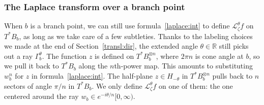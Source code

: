 \documentclass{article}
\theoremstyle{definition}
\newcommand{\maps}{\colon}
\newcommand{\R}{\mathbb{R}}
\newcommand{\C}{\mathbb{C}}
\newcommand{\laplace}{\mathcal{L}}
\newcommand{\borel}{\mathcal{B}}
\begin{document}
\subsubsection{The Laplace transform over a branch point}
When $b$ is a branch point, we can still use formula~\ref{laplace:int} to define $\laplace_\zeta^\theta f$ on $T^*B_b$, as long as we take care of a few subtleties. Thanks to the labeling choices we made at the end of Section~\ref{transl:dir}, the extended angle $\theta \in \R$ still picks out a ray $\Gamma_b^\theta$. The function $z$ is defined on $T^*B_b^{\otimes n}$, where $2\pi n$ is cone angle at $b$, so we pull it back to $T^*B_b$ along the $n$th-power map. This amounts to substituting $w_b^n$ for $z$ in formula~\ref{laplace:int}. The half-plane $z \in H_{-\theta}$ in $T^*B_b^{\otimes n}$ pulls back to $n$ sectors of angle $\pi/n$ in $T^*B_b$. We only define $\laplace_\zeta^\theta f$ on one of them: the one centered around the ray $w_b \in e^{-i\theta/n}[0, \infty)$.
\end{document}
